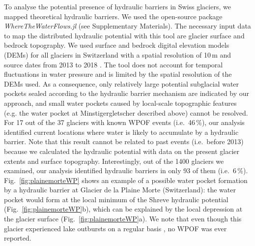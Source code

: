 To analyse the potential presence of hydraulic barriers in Swiss glaciers, we mapped theoretical hydraulic barriers. We used the open-source package \textit{WhereTheWaterFlows.jl} (see Supplementary Materials). The necessary input data to map the distributed hydraulic potential with this tool are glacier surface and bedrock topography. We used surface and bedrock digital elevation models (DEMs) for all glaciers in Switzerland with a spatial resolution of 10\,m and source dates from 2013 to 2018 \citep{Grab&al2021}. The tool does not account for temporal fluctuations in water pressure and is limited by the spatial resolution of the DEMs used. As a consequence, only relatively large potential subglacial water pockets sealed according to the hydraulic barrier mechanism are indicated by our approach, and small water pockets caused by local-scale topographic features (e.g. the water pocket at Minstigergletscher described above) cannot be resolved. For 17 out of the 37 glaciers with known WPOF events (i.e.\ 46\,\%), our analysis identified current locations where water is likely to accumulate by a hydraulic barrier. Note that this result cannot be related to past events (i.e.\ before 2013) because we calculated the hydraulic potential with data on the present glacier extents and surface topography. Interestingly, out of the 1400 glaciers we examined, our analysis identified hydraulic barriers in only 93 of them (i.e.\ 6\,\%).  Fig.~\ref{fig:plainemorteWP} shows an example of a possible water pocket formation by a hydraulic barrier at Glacier de la Plaine Morte (Switzerland): the water pocket would form at the local minimum of the Shreve hydraulic potential (Fig.~\ref{fig:plainemorteWP}b), which can be explained by the local depression at the glacier surface (Fig.~\ref{fig:plainemorteWP}a). We note that even though this glacier experienced lake outbursts on a regular basis \citep{Lindner&al2020,Ogier&al2021}, no WPOF was ever reported.


